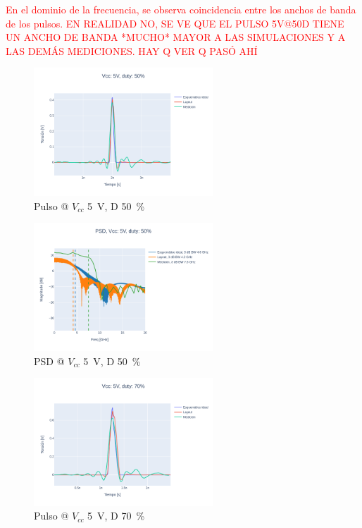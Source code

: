 \textcolor{red}{  
En el dominio de la frecuencia, se observa coincidencia entre los anchos de banda de los
pulsos.
EN REALIDAD NO, SE VE QUE EL PULSO 5V@50D TIENE UN ANCHO DE BANDA *MUCHO* MAYOR A 
LAS SIMULACIONES Y A LAS DEMÁS MEDICIONES.
HAY Q VER Q PASÓ AHÍ
}

\begin{figure}
  \centering
    \includegraphics[width=0.6\textwidth]{images/plots/Vcc_5V_duty_50_time_domain.png}
    \caption{Pulso @ $V_{cc}$ \qty{5}{\volt}, D \qty{50}{\percent} }
    \label{fig:plots_5v_50}
\end{figure}

\begin{figure}
  \centering
    \includegraphics[width=0.6\textwidth]{images/plots/Vcc_5V_duty_50_psd.png}
    \caption{PSD @ $V_{cc}$ \qty{5}{\volt}, D \qty{50}{\percent} }
    \label{fig:psd_5v_50}
\end{figure}

\begin{figure}
  \centering
    \includegraphics[width=0.6\textwidth]{images/plots/Vcc_5V_duty_70_time_domain.png}
    \caption{Pulso @ $V_{cc}$ \qty{5}{\volt}, D \qty{70}{\percent} }
    \label{fig:plots_5v_70}
\end{figure}

